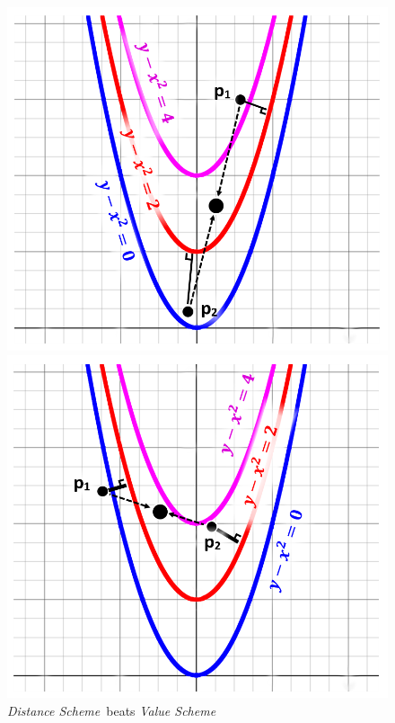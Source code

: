 \documentclass[10pt, conference]{IEEEtran}
\newcommand{\valueScheme}{\textit{Value Scheme}}
\newcommand{\distanceScheme}{\textit{Distance Scheme}}
\begin{document}
\begin{figure}[t]
\begin{minipage}[b]{0.5\linewidth}
\centering
\includegraphics[width=\textwidth]{Pics/distanceSchemeFails.PNG}
\caption{\valueScheme \ beats \distanceScheme}
\label{fig:valueBeatsDistanceFigure}
\end{minipage}
\begin{minipage}[b]{0.5\linewidth}
\centering
\includegraphics[width=\textwidth]{Pics/valueSchemeFails.PNG}
\caption{\distanceScheme \ beats \valueScheme}
\label{fig:distanceBeatsValueFigure}
\end{minipage}
\medskip


\end{figure}
\end{document}
